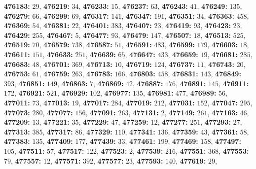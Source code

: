\textsf{\bfseries 476183:} $29$, \textsf{\bfseries 476219:} $34$, \textsf{\bfseries 476233:} $15$, \textsf{\bfseries 476237:} $63$, \textsf{\bfseries 476243:} $41$, \textsf{\bfseries 476249:} $135$, \textsf{\bfseries 476279:} $66$, \textsf{\bfseries 476299:} $69$, \textsf{\bfseries 476317:} $141$, \textsf{\bfseries 476347:} $191$, \textsf{\bfseries 476351:} $34$, \textsf{\bfseries 476363:} $458$, \textsf{\bfseries 476369:} $54$, \textsf{\bfseries 476381:} $22$, \textsf{\bfseries 476401:} $383$, \textsf{\bfseries 476407:} $23$, \textsf{\bfseries 476419:} $93$, \textsf{\bfseries 476423:} $23$, \textsf{\bfseries 476429:} $255$, \textsf{\bfseries 476467:} $5$, \textsf{\bfseries 476477:} $93$, \textsf{\bfseries 476479:} $147$, \textsf{\bfseries 476507:} $18$, \textsf{\bfseries 476513:} $525$, \textsf{\bfseries 476519:} $70$, \textsf{\bfseries 476579:} $738$, \textsf{\bfseries 476587:} $51$, \textsf{\bfseries 476591:} $483$, \textsf{\bfseries 476599:} $179$, \textsf{\bfseries 476603:} $18$, \textsf{\bfseries 476611:} $151$, \textsf{\bfseries 476633:} $251$, \textsf{\bfseries 476639:} $65$, \textsf{\bfseries 476647:} $433$, \textsf{\bfseries 476659:} $19$, \textsf{\bfseries 476681:} $285$, \textsf{\bfseries 476683:} $48$, \textsf{\bfseries 476701:} $369$, \textsf{\bfseries 476713:} $10$, \textsf{\bfseries 476719:} $124$, \textsf{\bfseries 476737:} $11$, \textsf{\bfseries 476743:} $20$, \textsf{\bfseries 476753:} $61$, \textsf{\bfseries 476759:} $263$, \textsf{\bfseries 476783:} $166$, \textsf{\bfseries 476803:} $458$, \textsf{\bfseries 476831:} $143$, \textsf{\bfseries 476849:} $393$, \textsf{\bfseries 476851:} $149$, \textsf{\bfseries 476863:} $7$, \textsf{\bfseries 476869:} $42$, \textsf{\bfseries 476887:} $176$, \textsf{\bfseries 476891:} $145$, \textsf{\bfseries 476911:} $172$, \textsf{\bfseries 476921:} $521$, \textsf{\bfseries 476929:} $102$, \textsf{\bfseries 476977:} $135$, \textsf{\bfseries 476981:} $477$, \textsf{\bfseries 476989:} $56$, \textsf{\bfseries 477011:} $73$, \textsf{\bfseries 477013:} $19$, \textsf{\bfseries 477017:} $284$, \textsf{\bfseries 477019:} $212$, \textsf{\bfseries 477031:} $152$, \textsf{\bfseries 477047:} $295$, \textsf{\bfseries 477073:} $280$, \textsf{\bfseries 477077:} $156$, \textsf{\bfseries 477091:} $263$, \textsf{\bfseries 477131:} $2$, \textsf{\bfseries 477149:} $261$, \textsf{\bfseries 477163:} $46$, \textsf{\bfseries 477209:} $13$, \textsf{\bfseries 477221:} $35$, \textsf{\bfseries 477229:} $47$, \textsf{\bfseries 477259:} $12$, \textsf{\bfseries 477277:} $251$, \textsf{\bfseries 477293:} $27$, \textsf{\bfseries 477313:} $385$, \textsf{\bfseries 477317:} $86$, \textsf{\bfseries 477329:} $110$, \textsf{\bfseries 477341:} $136$, \textsf{\bfseries 477359:} $43$, \textsf{\bfseries 477361:} $58$, \textsf{\bfseries 477383:} $135$, \textsf{\bfseries 477409:} $177$, \textsf{\bfseries 477439:} $33$, \textsf{\bfseries 477461:} $199$, \textsf{\bfseries 477469:} $158$, \textsf{\bfseries 477497:} $105$, \textsf{\bfseries 477511:} $57$, \textsf{\bfseries 477517:} $122$, \textsf{\bfseries 477523:} $2$, \textsf{\bfseries 477539:} $216$, \textsf{\bfseries 477551:} $368$, \textsf{\bfseries 477553:} $79$, \textsf{\bfseries 477557:} $12$, \textsf{\bfseries 477571:} $392$, \textsf{\bfseries 477577:} $23$, \textsf{\bfseries 477593:} $140$, \textsf{\bfseries 477619:} $29$, 
